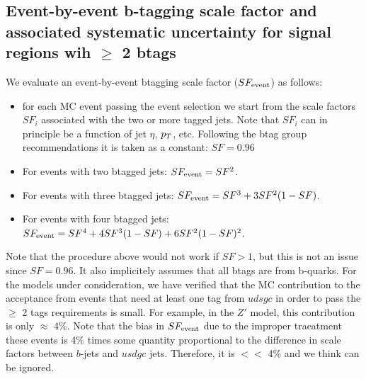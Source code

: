 \subsection{Event-by-event b-tagging scale factor and 
associated systematic uncertainty for signal regions wih $\geq$ 2 btags}
\label{sec:SF2btag}

We evaluate an event-by-event btagging scale factor ($SF_{\rm event}$) as follows:

\begin{itemize}
\item for each MC event passing the event selection we start
from the scale factors $SF_i$ associated with the two or more
tagged jets.  Note that $SF_i$ can in principle be a function 
of jet $\eta$, $p_T$, etc.  Following the btag group 
recommendations
it is taken as a constant: $SF=0.96$\cite{BTV11003, btvSyst}


\item For events with two btagged jets: $SF_{\rm event}=SF^2$.

\item For events with three btagged jets: $SF_{\rm event}=SF^3 + 3SF^2(1-SF)$.

\item For events with four btagged jets: $SF_{\rm event}=SF^4 + 4SF^3(1-SF) + 6SF^2(1-SF)^2$.
\end{itemize}

Note that the procedure above would not work if $SF>1$, but this is not an issue
since $SF=0.96$.
It also implicitely assumes that all btags are from b-quarks.  For the models under 
consideration, we have verified that the MC contribution to the acceptance from 
events that need at least one tag from $udsgc$ in order to pass the $\ge$ 2 tags 
requirements is small.  For example, in the $Z'$ model, this contribution is
only $\approx$ 4\%.  Note that the bias in $SF_{\rm event}$ due to the improper traeatment
these events is 4\% times some quantity proportional to the difference in scale 
factors between $b$-jets and $usdgc$ jets.  Therefore, it is $<<$ 4\% and we think
can be ignored.  

